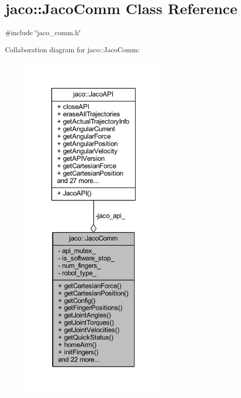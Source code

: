 \hypertarget{classjaco_1_1JacoComm}{}\section{jaco\+:\+:Jaco\+Comm Class Reference}
\label{classjaco_1_1JacoComm}


{\ttfamily \#include \char`\"{}jaco\+\_\+comm.\+h\char`\"{}}



Collaboration diagram for jaco\+:\+:Jaco\+Comm\+:
\nopagebreak
\begin{figure}[H]
\begin{center}
\leavevmode
\includegraphics[width=205pt]{dc/dca/classjaco_1_1JacoComm__coll__graph}
\end{center}
\end{figure}
